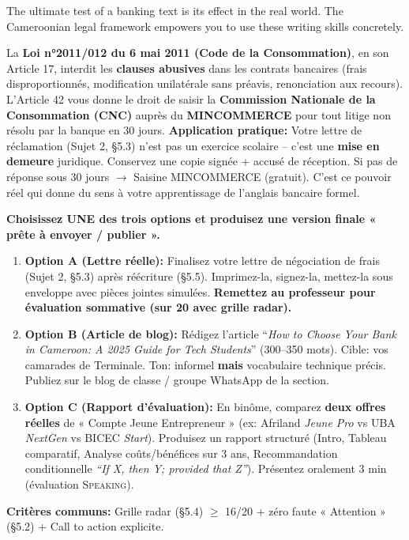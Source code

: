 \documentclass[11pt]{article}
\newcounter{popsec}
\newcounter{popsub}
\newcommand{\courssub}[1]{%
  \stepcounter{popsub}%
  \par\vspace{9pt}\noindent{\popxbold\fontsize{11.5}{13}\selectfont\color{popink}{\color{poporange}\thepopsec.\thepopsub}\hspace{6pt}#1}\par\nopagebreak\vspace{4pt}
}
\begin{document}
\courssub{Publication \& Real-World Application}

The ultimate test of a banking text is its effect in the real world. The Cameroonian legal framework empowers you to use these writing skills concretely.

\begin{savaistu}
La \textbf{Loi n°2011/012 du 6 mai 2011 (Code de la Consommation)}, en son Article 17, interdit les \textbf{clauses abusives} dans les contrats bancaires (frais disproportionnés, modification unilatérale sans préavis, renonciation aux recours). L'Article 42 vous donne le droit de saisir la \textbf{Commission Nationale de la Consommation (CNC)} auprès du \textbf{MINCOMMERCE} pour tout litige non résolu par la banque en 30 jours.
\textbf{Application pratique:} Votre lettre de réclamation (Sujet 2, \S5.3) n'est pas un exercice scolaire -- c'est une \textbf{mise en demeure} juridique. Conservez une copie signée + accusé de réception. Si pas de réponse sous 30 jours $\rightarrow$ Saisine MINCOMMERCE (gratuit). C'est ce pouvoir réel qui donne du sens à votre apprentissage de l'anglais bancaire formel.
\end{savaistu}

\begin{exercice}
\textbf{Choisissez UNE des trois options et produisez une version finale « prête à envoyer / publier ».}
\begin{enumerate}
    \item \textbf{Option A (Lettre réelle):} Finalisez votre lettre de négociation de frais (Sujet 2, \S5.3) après réécriture (\S5.5). Imprimez-la, signez-la, mettez-la sous enveloppe avec pièces jointes simulées. \textbf{Remettez au professeur pour évaluation sommative (sur 20 avec grille radar).}
    \item \textbf{Option B (Article de blog):} Rédigez l'article ``\textit{How to Choose Your Bank in Cameroon: A 2025 Guide for Tech Students}'' (300--350 mots). Cible: vos camarades de Terminale. Ton: informel \textbf{mais} vocabulaire technique précis. Publiez sur le blog de classe / groupe WhatsApp de la section.
    \item \textbf{Option C (Rapport d'évaluation):} En binôme, comparez \textbf{deux offres réelles} de « Compte Jeune Entrepreneur » (ex: Afriland \textit{Jeune Pro} vs UBA \textit{NextGen} vs BICEC \textit{Start}). Produisez un rapport structuré (Intro, Tableau comparatif, Analyse coûts/bénéfices sur 3 ans, Recommandation conditionnelle \textit{``If X, then Y; provided that Z''}). Présentez oralement 3 min (évaluation \textsc{Speaking}).
\end{enumerate}
\textbf{Critères communs:} Grille radar (\S5.4) $\ge$ 16/20 + zéro faute « Attention » (\S5.2) + Call to action explicite.
\end{exercice}
\end{document}
